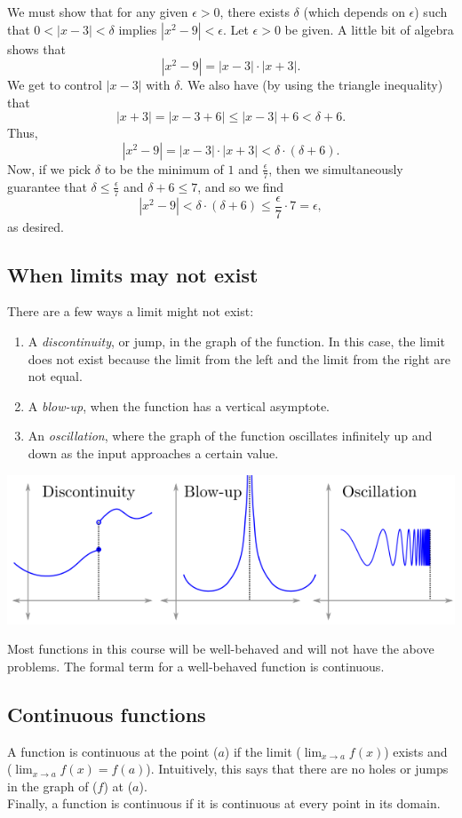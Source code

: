 \documentclass[a4paper]{book}
\begin{document}
\begin{sloppypar}
\begin{examplebox}
We must show that for any given $\epsilon>0$, there exists $\delta$ (which depends on $\epsilon$) such that $0<|x-3|<\delta$ implies $|x^2-9|<\epsilon$.
Let $\epsilon>0$ be given. A little bit of algebra shows that \[ |x^2-9| = |x-3| \cdot |x+3|. \]
We get to control $|x-3|$ with $\delta$. We also have (by using the triangle inequality) that \[ |x+3| = |x-3+6| \leq |x-3|+6 < \delta + 6. \]
Thus, \[ |x^2-9| = |x-3|\cdot |x+3| < \delta \cdot (\delta + 6). \]
Now, if we pick $\delta$ to be the minimum of $1$ and $\frac{\epsilon}{7}$, then we simultaneously guarantee that $\delta \leq \frac{\epsilon}{7}$ and $\delta + 6 \leq 7$, and so we find \[ |x^2-9| < \delta \cdot (\delta + 6) \leq \frac{\epsilon}{7} \cdot 7 = \epsilon, \] as desired.
\end{examplebox}
\subsection{When limits may not exist}
There are a few ways a limit might not exist:
\begin{enumerate}
	\item A \textit{discontinuity}, or jump, in the graph of the function. In this case, the limit does not exist because the limit from the left and the limit from the right are not equal.
	\item A \textit{blow-up}, when the function has a vertical asymptote.
	\item An \textit{oscillation}, where the graph of the function oscillates infinitely up and down as the input approaches a certain value.
\end{enumerate}
\begin{center}\includegraphics[scale=0.6]{LimitFails}\end{center}
Most functions in this course will be well-behaved and will not have the above problems. The formal term for a well-behaved function is continuous.

\subsection{Continuous functions}
A function is continuous at the point ($a$) if the limit ($\lim_{x \rightarrow a} f(x)$) exists and ($\lim_{x \rightarrow a} f(x) = f(a)$). Intuitively, this says that there are no holes or jumps in the graph of ($f$) at ($a$).\\
Finally, a function is continuous if it is continuous at every point in its domain.


\end{sloppypar}
\end{document}
